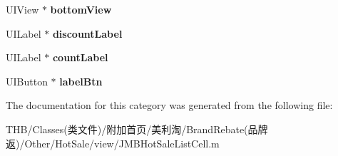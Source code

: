 \begin{DoxyCompactItemize}
U\+I\+View $\ast$ {\bfseries bottom\+View}
\item 
\mbox{\label{category_j_m_b_hot_sale_list_cell_07_08_a865a60a6e301146eba4605e8607c83f0}} 
U\+I\+Label $\ast$ {\bfseries discount\+Label}
\item 
\mbox{\label{category_j_m_b_hot_sale_list_cell_07_08_a3f75a29d578860ddbba53733ea342aa2}} 
U\+I\+Label $\ast$ {\bfseries count\+Label}
\item 
\mbox{\label{category_j_m_b_hot_sale_list_cell_07_08_aea3ae36c15b5b5fd150d392b8b1d7802}} 
U\+I\+Button $\ast$ {\bfseries label\+Btn}
\end{DoxyCompactItemize}


The documentation for this category was generated from the following file\+:\begin{DoxyCompactItemize}
\item 
T\+H\+B/\+Classes(类文件)/附加首页/美利淘/\+Brand\+Rebate(品牌返)/\+Other/\+Hot\+Sale/view/J\+M\+B\+Hot\+Sale\+List\+Cell.\+m\end{DoxyCompactItemize}
